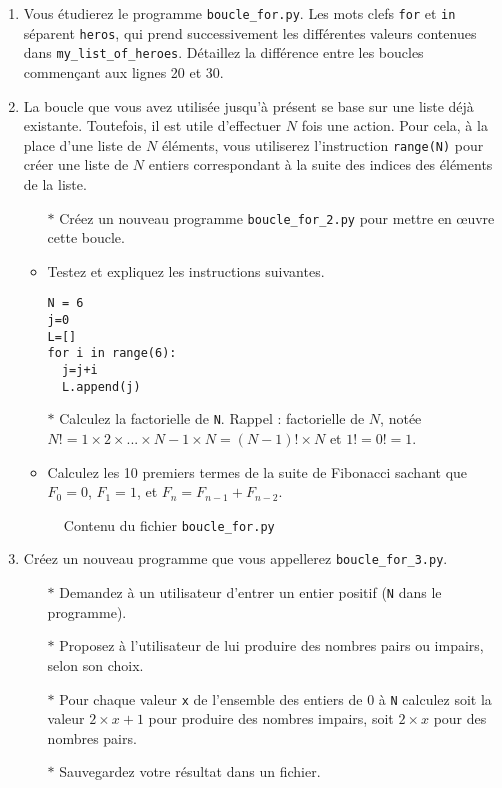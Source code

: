 \begin{enumerate}
\item Vous  étudierez le programme \texttt{boucle\_for.py}.   Les mots
  clefs \texttt{for} et \texttt{in} séparent \texttt{heros}, qui prend
  successivement    les    différentes    valeurs    contenues    dans
  \texttt{my\_list\_of\_heroes}.  Détaillez la  différence entre les
  boucles commençant aux lignes 20 et 30.

\item La boucle que vous avez  utilisée jusqu'à présent se base sur une
  liste déjà existante.  Toutefois,  il est utile d'effectuer $N$
  fois une  action. Pour cela, à  la place d'une liste  de $N$
  éléments, vous utiliserez  l'instruction \texttt{range(N)} pour créer
  une liste de $N$ entiers correspondant à la suite des indices des éléments
  de la liste.
  \begin{itemize}
  \item[$\ast$]  Créez un  nouveau  programme \texttt{boucle\_for\_2.py}  pour
    mettre en \oe{}uvre cette boucle.
  \item Testez et expliquez les instructions suivantes.
\begin{verbatim}
N = 6
j=0
L=[]
for i in range(6):
  j=j+i
  L.append(j)
\end{verbatim}

  \item[$\ast$] Calculez la factorielle de \texttt{N}.
    Rappel : factorielle de
      $N$, notée $N!=1 \times 2 \times... \times N-1 \times N = (N-1)! \times N $ et $1! = 0! = 1$.
    \item Calculez les 10 premiers termes de la suite de Fibonacci sachant que $F_0=0$, $F_1=1$, et $F_n =F_{n-1}+F_{n-2}$. 
  \end{itemize}
\begin{figure}  
  
  \caption{Contenu du fichier \texttt{boucle\_for.py}}
\end{figure}

\item    Créez   un    nouveau   programme    que   vous    appellerez
  \texttt{boucle\_for\_3.py}.
  \begin{itemize}
  \item[$\ast$]  Demandez   à  un  utilisateur  d'entrer   un  entier  positif
    (\texttt{N} dans le programme).
  \item[$\ast$]  Proposez à  l'utilisateur de lui  produire des  nombres pairs  ou
    impairs, selon son choix.
  \item[$\ast$] Pour chaque valeur \texttt{x} de l'ensemble des entiers de 0
    à \texttt{N} calculez soit la  valeur $2\times x+1$ pour produire
    des nombres impairs, soit $2\times x$ pour des nombres pairs.
  \item[$\ast$]    Sauvegardez     votre    résultat    dans     un    fichier.
  \end{itemize}

\end{enumerate}





